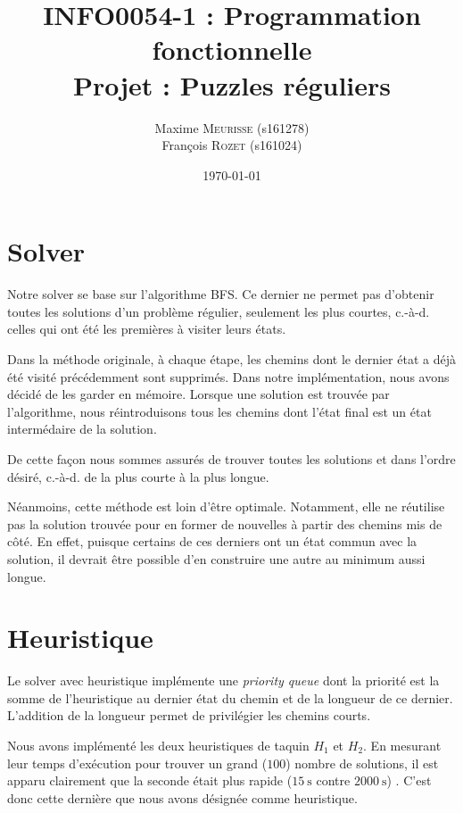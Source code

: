 \documentclass[a4paper, 11pt]{article}
\title{\textbf{\textsc{INFO0054-1} : Programmation fonctionnelle}\\Projet : Puzzles réguliers}
\author{Maxime \textsc{Meurisse} (s161278)\\François \textsc{Rozet} (s161024)\\}
\date{\today}
\begin{document}
    \maketitle
    \section{Solver}
    Notre solver se base sur l'algorithme BFS. Ce dernier ne permet pas d'obtenir toutes les solutions d'un problème régulier, seulement les plus courtes, c.-à-d. celles qui ont été les \og{}premières\fg{} à visiter leurs états. \par
    Dans la méthode originale, à chaque étape, les chemins dont le dernier état a déjà été visité précédemment sont supprimés. Dans notre implémentation, nous avons décidé de les garder en mémoire. Lorsque une solution est trouvée par l'algorithme, nous réintroduisons tous les chemins dont l'état final est un état intermédaire de la solution. \par
    De cette façon nous sommes assurés de trouver toutes les solutions et dans l'ordre désiré, c.-à-d. de la plus courte à la plus longue. \par
    Néanmoins, cette méthode est loin d'être optimale. Notamment, elle ne réutilise pas la solution trouvée pour en former de nouvelles à partir des chemins mis de côté. En effet, puisque certains de ces derniers ont un état commun avec la solution, il devrait être possible d'en construire une autre au minimum aussi longue.
    \setcounter{section}{2}
    \section{Heuristique}
    Le solver \og{}avec heuristique\fg{} implémente une \emph{priority queue} dont la priorité est la somme de l'heuristique au dernier état du chemin et de la longueur de ce dernier. L'addition de la longueur permet de privilégier les chemins courts. \par
    Nous avons implémenté les deux heuristiques de taquin $H_1$ et $H_2$. En mesurant leur temps d'exécution pour trouver un grand ($\num{100}$) nombre de solutions, il est apparu clairement que la seconde était plus rapide ($\SI{15}{\second}$ contre $\SI{2000}{\second}$) . C'est donc cette dernière que nous avons désignée comme heuristique.
\end{document}
